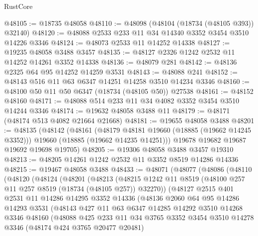 \begin{lexlean}{RustCore}
\begin{coremodule}
@48105 := @18735 @48058
@48110 := @48098 (@48104 (@18734 (@48105 @393)) @32140)
@48120 := @48088 @2533 @233 @11 @34 @14340 @3352 @3454 @3510 @14226 @3346
@48124 := @48073 @2533 @11 @14252 @14338
@48127 := @19235 @48058 @3488 @3457
@48135 := @48127 @2326 @1242 @2532 @11 @14252 @14261 @3352 @14338
@48136 := @48079 @281
@48142 := @48136 @2325 @64 @95 @14252 @14259 @3531
@48143 := @48088 @241
@48152 := @48143 @516 @11 @63 @6347 @14251 @14258 @3510 @14234 @3346
@48160 := @48100 @50 @11 @50 @6347 (@18734 (@48105 @50)) @27538
@48161 := @48152 @48160
@48171 := @48088 @514 @233 @11 @34 @4082 @3352 @3454 @3510 @14244 @3346
@48174 := @19632 @48058 @3488 @11
@48179 := @48171 (@48174 @513 @4082 @21664 @21668)
@48181 := @19655 @48058 @3488
@48201 := @48135
    (@48142
      (@48161
        (@48179 @48181 @19660 (@18885 (@19662 @14245 @3352)))
        @19660
        (@18885 (@19662 @14235 @14251)))
      @19678
      @19682
      @19687
      @19692
      @19698
      @19705)
@48205 := @19306 @48058 @3488 @3457 @19310
@48213 := @48205 @14261 @1242 @2532 @11 @3352 @8519 @14286 @14336
@48215 := @19467 @48058 @3488
@48433 := @48071
    (@48077
      (@48086
        (@48110
          (@48120
            (@48124
              (@48201
                (@48213
                  (@48215
                    @1242
                    @11
                    @8519
                    (@48100 @257 @11 @257 @8519 (@18734 (@48105 @257)) @32270))
                  (@48127
                    @2515
                    @401
                    @2531
                    @11
                    @14286
                    @14295
                    @3352
                    @14336
                    (@48136
                      @2060
                      @64
                      @95
                      @14286
                      @14293
                      @3531
                      (@48143
                        @427
                        @11
                        @63
                        @6347
                        @14285
                        @14292
                        @3510
                        @14268
                        @3346
                        @48160
                        (@48088
                          @425
                          @233
                          @11
                          @34
                          @3765
                          @3352
                          @3454
                          @3510
                          @14278
                          @3346
                          (@48174 @424 @3765 @20477 @20481)

\end{coremodule}
\end{lexlean}
